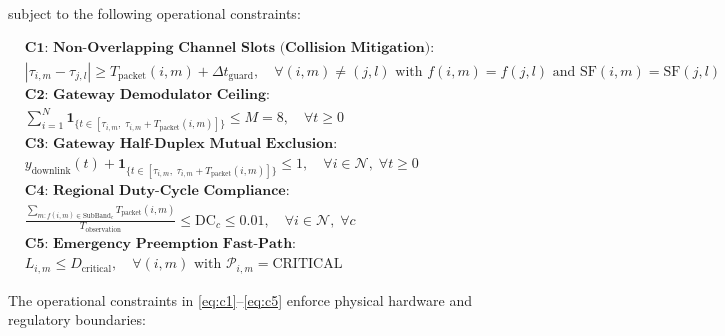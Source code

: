 \documentclass[preprint,review,12pt]{elsarticle}
\begin{document}
subject to the following operational constraints:

\begin{align}

&\textbf{C1: Non-Overlapping Channel Slots (Collision Mitigation):} \nonumber \\

&|\tau_{i,m} - \tau_{j,l}| \ge T_{\text{packet}}(i,m) + \Delta t_{\text{guard}}, \quad \forall (i,m) \ne (j,l) \text{ with } f(i,m) = f(j,l) \text{ and } \text{SF}(i,m) = \text{SF}(j,l) \label{eq:c1} \\[6pt]

&\textbf{C2: Gateway Demodulator Ceiling:} \nonumber \\

&\sum_{i=1}^N \mathbf{1}_{\{t \in [\tau_{i,m}, \; \tau_{i,m} + T_{\text{packet}}(i,m)]\}} \le M = 8, \quad \forall t \ge 0 \label{eq:c2} \\[6pt]

&\textbf{C3: Gateway Half-Duplex Mutual Exclusion:} \nonumber \\

&y_{\text{downlink}}(t) + \mathbf{1}_{\{t \in [\tau_{i,m}, \; \tau_{i,m} + T_{\text{packet}}(i,m)]\}} \le 1, \quad \forall i \in \mathcal{N}, \; \forall t \ge 0 \label{eq:c3} \\[6pt]

&\textbf{C4: Regional Duty-Cycle Compliance:} \nonumber \\

&\frac{\sum_{m: f(i,m) \in \text{SubBand}_c} T_{\text{packet}}(i,m)}{T_{\text{observation}}} \le \text{DC}_c \le 0.01, \quad \forall i \in \mathcal{N}, \; \forall c \label{eq:c4} \\[6pt]

&\textbf{C5: Emergency Preemption Fast-Path:} \nonumber \\

&L_{i,m} \le D_{\text{critical}}, \quad \forall (i,m) \text{ with } \mathcal{P}_{i,m} = \text{CRITICAL} \label{eq:c5}

\end{align}

The operational constraints in \eqref{eq:c1}--\eqref{eq:c5} enforce physical hardware and regulatory boundaries:
\end{document}
